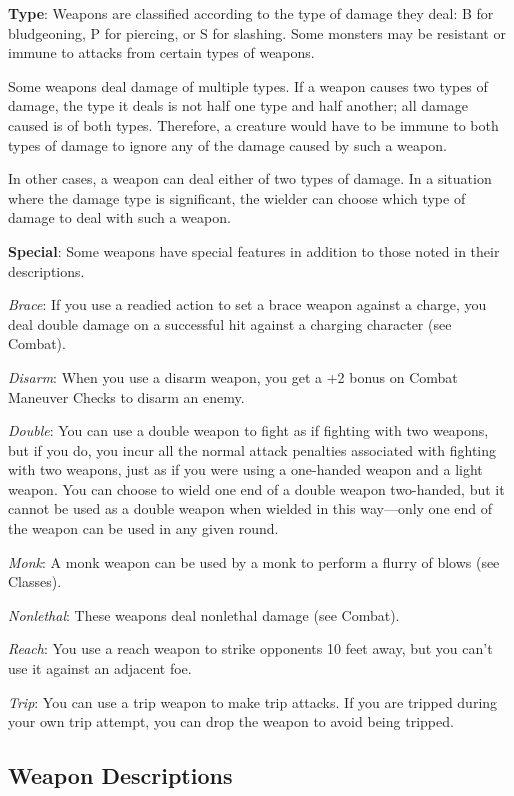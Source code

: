\textbf{Type}: Weapons are classified according to the type of damage they deal: B for bludgeoning, P for piercing, or S for slashing. Some monsters may be resistant or immune to attacks from certain types of weapons.
		
Some weapons deal damage of multiple types. If a weapon causes two types of damage, the type it deals is not half one type and half another; all damage caused is of both types. Therefore, a creature would have to be immune to both types of damage to ignore any of the damage caused by such a weapon.
		
In other cases, a weapon can deal either of two types of damage. In a situation where the damage type is significant, the wielder can choose which type of damage to deal with such a weapon.
		
\textbf{Special}: Some weapons have special features in addition to those noted in their descriptions. 
		
\textit{Brace}: If you use a readied action to set a brace weapon against a charge, you deal double damage on a successful hit against a charging character (see Combat).
		
\textit{Disarm}: When you use a disarm weapon, you get a +2 bonus on Combat Maneuver Checks to disarm an enemy.
		
\textit{Double}: You can use a double weapon to fight as if fighting with two weapons, but if you do, you incur all the normal attack penalties associated with fighting with two weapons, just as if you were using a one-handed weapon and a light weapon. You can choose to wield one end of a double weapon two-handed, but it cannot be used as a double weapon when wielded in this way---only one end of the weapon can be used in any given round.
		
\textit{Monk}: A monk weapon can be used by a monk to perform a flurry of blows (see Classes).
		
\textit{Nonlethal}: These weapons deal nonlethal damage (see Combat).
		
\textit{Reach}: You use a reach weapon to strike opponents 10 feet away, but you can't use it against an adjacent foe.
		
\textit{Trip}: You can use a trip weapon to make trip attacks. If you are tripped during your own trip attempt, you can drop the weapon to avoid being tripped.
	
\subsection{Weapon Descriptions}

